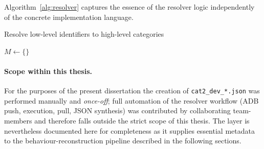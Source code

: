 \documentclass[a4paper,12pt]{report}
\begin{document}
Algorithm~\ref{alg:resolver} captures the essence of the resolver logic
independently of the concrete implementation language.

\begin{algorithm}[H]
\footnotesize
\caption{Resolve low-level identifiers to high-level categories}
\label{alg:resolver}
\DontPrintSemicolon
{}
$M \leftarrow \{\}$
\BlankLine
{}
\BlankLine
{}
\end{algorithm}


\paragraph{Scope within this thesis.}
For the purposes of the present dissertation the creation of
\texttt{cat2\_dev\_*.json} was performed manually and
\emph{once-off}; full automation of the resolver workflow (ADB push,
execution, pull, JSON synthesis) was contributed by collaborating
team-members and therefore falls outside the strict scope of this
thesis.  The layer is nevertheless documented here for completeness
as it supplies essential metadata to the behaviour-reconstruction
pipeline described in the following sections.
\end{document}
